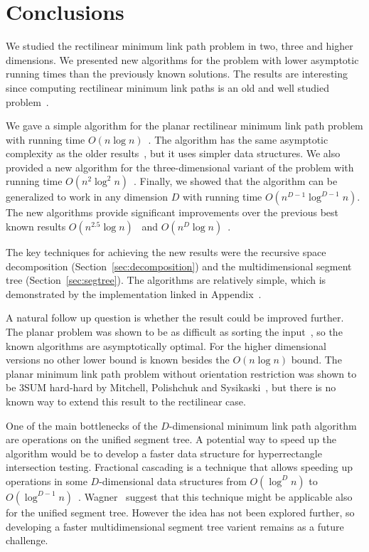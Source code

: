 \documentclass[english,gradu]{tktltiki2018}
\begin{document}
\section{Conclusions}\label{sec:conclusions}

We studied the rectilinear minimum link path problem in two, three and higher dimensions.
We presented new algorithms for the problem with lower asymptotic running times than the previously known solutions.
The results are interesting since computing rectilinear minimum link paths is an old and well studied problem~\cite{restricted,wagner}.

We gave a simple algorithm for the planar rectilinear minimum link path problem with running time $O(n\log n)$~\cite{revisited}.
The algorithm has the same asymptotic complexity as the older results~\cite{dasnar,sato}, but it uses simpler data structures.
We also provided a new algorithm for the three-dimensional variant of the problem with running time $O(n^2\log^2 n)$~\cite{restricted}.
Finally, we showed that the algorithm can be generalized to work in any dimension $D$ with running time $O(n^{D-1}\log^{D-1}n)$.
The new algorithms provide significant improvements over the previous best known results $O(n^{2.5}\log n)$~\cite{wagner} and $O(n^D\log n)$~\cite{de1992}.

The key techniques for achieving the new results were the recursive space decomposition (Section~\ref{sec:decomposition}) and the multidimensional segment tree (Section~\ref{sec:segtree}).
The algorithms are relatively simple, which is demonstrated by the implementation linked in Appendix~\apxsrc.

A natural follow up question is whether the result could be improved further.
The planar problem was shown to be as difficult as sorting the input~\cite{dasnar}, so the known algorithms are asymptotically optimal.
For the higher dimensional versions no other lower bound is known besides the $O(n\log n)$ bound.
The planar minimum link path problem without orientation restriction was shown to be 3SUM hard-hard by Mitchell, Polishchuk and Sysikaski~\cite{revisited}, but there is no known way to extend this result to the rectilinear case.

One of the main bottlenecks of the $D$-dimensional minimum link path algorithm are operations on the unified segment tree.
A potential way to speed up the algorithm would be to develop a faster data structure for hyperrectangle intersection testing.
Fractional cascading is a technique that allows speeding up operations in some $D$-dimensional data structures from $O(\log^D n)$ to $O(\log^{D-1} n)$~\cite{fractional,ortho}.
Wagner~\cite{unified} suggest that this technique might be applicable also for the unified segment tree.
However the idea has not been explored further, so developing a faster multidimensional segment tree varient remains as a future challenge.
\end{document}
